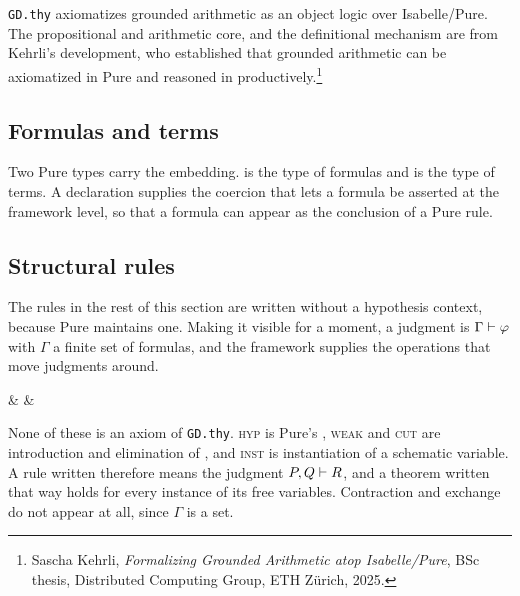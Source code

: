 \section{\QGA}
\label{sec:qga}

\texttt{GD.thy} axiomatizes grounded arithmetic as an object logic over
Isabelle/Pure.  The propositional and arithmetic core, and the definitional
mechanism are from Kehrli's development, who established
that grounded arithmetic can be axiomatized in Pure and reasoned in
productively.\footnote{Sascha Kehrli, \emph{Formalizing Grounded Arithmetic atop
Isabelle/Pure}, BSc thesis, Distributed Computing Group, ETH Z\"urich, 2025.}

\subsection{Formulas and terms}

Two Pure types carry the embedding.   is the type of \QGA{} formulas and
 is the type of \QGA{} terms.  A  declaration supplies
the coercion  that lets a formula be asserted at the
framework level, so that a \QGA{} formula can appear as the conclusion of a
Pure rule.

\subsection{Structural rules}
\label{sec:structural}

The rules in the rest of this section are written without a hypothesis context,
because Pure maintains one.  Making it visible for a moment, a \QGA{} judgment is
$\Gamma \vdash \varphi$ with $\Gamma$ a finite set of formulas, and the framework
supplies the operations that move judgments around.

\begin{rulesiii}
 &
 &
\\[3.2ex]
\end{rulesiii}

\noindent
None of these is an axiom of \texttt{GD.thy}.  \textsc{hyp} is Pure's
, \textsc{weak} and \textsc{cut} are introduction and elimination of
, and \textsc{inst} is instantiation of a schematic variable.  A rule
written  therefore means the judgment $P, Q \vdash R$, and a
theorem written that way holds for every instance of its free variables.
Contraction and exchange do not appear at all, since $\Gamma$ is a set.

